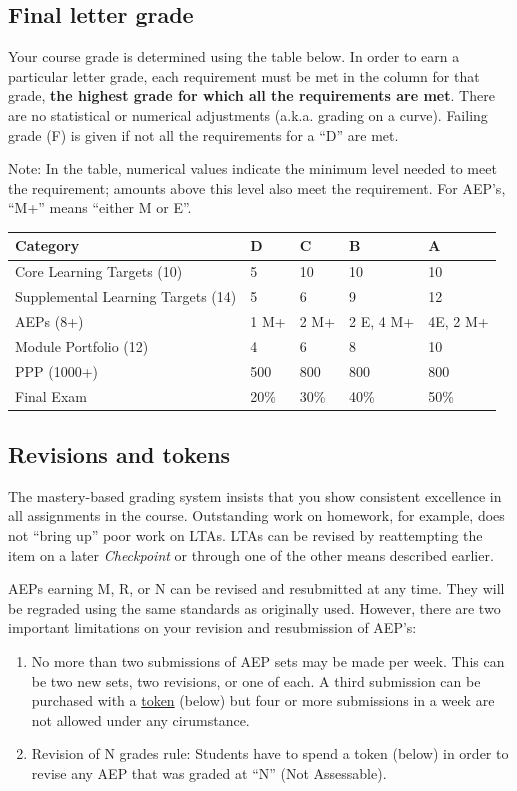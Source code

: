 \hypertarget{final-letter-grade}{%
\subsection{Final letter grade}\label{final-letter-grade}}

Your course grade is determined using the table below. In order to earn
a particular letter grade, each requirement must be met in the column
for that grade, \textbf{the highest grade for which all the requirements
are met}. There are no statistical or numerical adjustments (a.k.a.
grading on a curve). Failing grade (F) is given if not all the
requirements for a ``D'' are met.

Note: In the table, numerical values indicate the minimum level needed
to meet the requirement; amounts above this level also meet the
requirement. For AEP's, ``M+'' means ``either M or E''.

\begin{longtable}[]{@{}lllll@{}}
\toprule
Category & D & C & B & A\tabularnewline
\midrule
\endhead
Core Learning Targets (10) & 5 & 10 & 10 & 10\tabularnewline
Supplemental Learning Targets (14) & 5 & 6 & 9 & 12\tabularnewline
AEPs (8+) & 1 M+ & 2 M+ & 2 E, 4 M+ & 4E, 2 M+\tabularnewline
Module Portfolio (12) & 4 & 6 & 8 & 10\tabularnewline
PPP (1000+) & 500 & 800 & 800 & 800\tabularnewline
Final Exam & 20\% & 30\% & 40\% & 50\%\tabularnewline
\bottomrule
\end{longtable}

\hypertarget{revisions}{%
\subsection{Revisions and tokens}\label{revisions}}

The mastery-based grading system insists that you show consistent
excellence in all assignments in the course. Outstanding work on
homework, for example, does not ``bring up'' poor work on LTAs. LTAs can
be revised by reattempting the item on a later \emph{Checkpoint} or
through one of the other means described earlier.

AEPs earning M, R, or N can be revised and resubmitted at any time. They
will be regraded using the same standards as originally used. However,
there are two important limitations on your revision and resubmission of
AEP's:

\begin{enumerate}
\def\labelenumi{\arabic{enumi}.}
\tightlist
\item
  No more than two submissions of AEP sets may be made per week. This
  can be two new sets, two revisions, or one of each. A third submission
  can be purchased with a \protect\hyperlink{tokens}{token} (below) but
  four or more submissions in a week are not allowed under any
  cirumstance.
\item
  Revision of N grades rule: Students have to spend a token (below) in
  order to revise any AEP that was graded at ``N'' (Not Assessable).
\end{enumerate}


